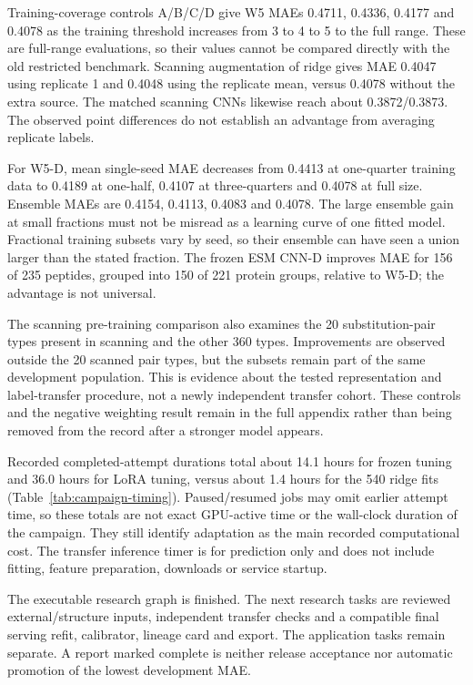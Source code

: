 Training-coverage controls A/B/C/D give W5 MAEs 0.4711, 0.4336, 0.4177 and 0.4078 as the
training threshold increases from 3 to 4 to 5 to the full range. These are full-range evaluations,
so their values cannot be compared directly with the old restricted benchmark. Scanning augmentation
of ridge gives MAE 0.4047 using replicate 1 and 0.4048 using the replicate mean, versus 0.4078
without the extra source. The matched scanning CNNs likewise reach about 0.3872/0.3873.
The observed point differences do not establish an advantage from averaging replicate labels.

For W5-D, mean single-seed MAE decreases from 0.4413 at one-quarter training data to 0.4189 at
one-half, 0.4107 at three-quarters and 0.4078 at full size. Ensemble MAEs are 0.4154, 0.4113,
0.4083 and 0.4078. The large ensemble gain at small fractions must not be misread as a learning
curve of one fitted model. Fractional training subsets vary by seed, so their ensemble can have
seen a union larger than the stated fraction. The frozen ESM CNN-D improves MAE for 156 of
235 peptides, grouped
into 150 of 221 protein groups, relative to W5-D; the advantage is not universal.

The scanning pre-training comparison also examines the 20 substitution-pair types present
in scanning and the other 360 types. Improvements are observed outside the 20 scanned pair types,
but the subsets remain part of the same development population. This is evidence about the tested
representation and label-transfer procedure, not a newly independent transfer cohort. These controls
and the negative weighting result remain in the full appendix rather than being removed from the
record after a stronger model appears.

Recorded completed-attempt durations total about 14.1 hours for frozen tuning and 36.0 hours for
LoRA tuning, versus about 1.4 hours for the 540 ridge fits (Table~\ref{tab:campaign-timing}).
Paused/resumed jobs may omit earlier attempt time, so these totals are not exact GPU-active time
or the wall-clock duration of the campaign. They still identify adaptation as the main recorded
computational cost. The transfer inference timer is for prediction only and does not include fitting,
feature preparation, downloads or service startup.

The executable research graph is finished. The next research tasks are reviewed external/structure
inputs, independent transfer checks and a compatible final serving refit, calibrator, lineage card and
export. The application tasks remain separate. A report marked complete is neither release acceptance
nor automatic promotion of the lowest development MAE.
